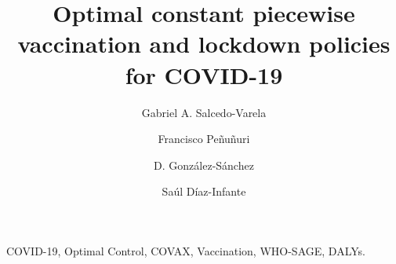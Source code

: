 \begin{frontmatter}
    \title{
        Optimal constant piecewise vaccination and lockdown
        policies for COVID-19
    }
    \author[add:unison]%
    {Gabriel A. Salcedo-Varela
    }
    \address[add:unison]{
        Departamento de Matem\'aticas, Universidad de Sonora,
        Blvd. Luis Encinas y Rosales S/N,
        Hermosillo, Sonora, M\'exico, C.P. 83000.
    }
    \author[add:UADY]%
    {Francisco Pe\~nu\~nuri}
    \address[add:UADY]{Facultad de Ingenier\'ia, Universidad
    Aut\'onoma de Yucat\'an, A.P. 150, Cordemex, M\'erida, Yucat\'an,
    M\'exico.}
    \author[add:conacyt_unison]{D. Gonz\'alez-S\'anchez}
        \address[add:conacyt_unison]{
        CONACYT-Universidad de Sonora,
        Departamento de Matem\'aticas,
        Blvd. Luis Encinas y Rosales S/N,
        Hermosillo, Sonora, M\'exico, C.P. 83000.
    }
    \author[add:conacyt_unison]{%
        Sa\'ul D\'iaz-Infante%
    }%
    
    \begin{keyword}
        COVID-19, Optimal Control, COVAX,
        Vaccination, WHO-SAGE, DALYs.
    \end{keyword}
\end{frontmatter}